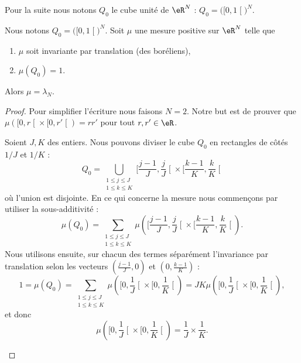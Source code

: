 Pour la suite nous notons \( Q_0\) le cube unité de \( \eR^N\) : \( Q_0=\big( \mathopen[ 0 , 1 \mathclose[ \big)^N\).

\begin{theorem}        \label{ThoCABFooHbUzWc}
	Nous notons  \( Q_0=\big( \mathopen[ 0 , 1 \mathclose[ \big)^N\). Soit \( \mu\) une mesure positive sur \( \eR^N\) telle que
	\begin{enumerate}
		\item
		      \( \mu\) soit invariante par translation (des boréliens),
		\item
		      \( \mu(Q_0)=1\).
	\end{enumerate}
	Alors \( \mu=\lambda_N\).
\end{theorem}

\begin{proof}
	Pour simplifier l'écriture nous faisons \( N=2\). Notre but est de prouver que \( \mu(  \mathopen[ 0 , r \mathclose[\times \mathopen[ 0 , r' \mathclose[ )=rr'\) pour tout \( r,r'\in \eR\).

	\begin{subproof}
		\spitem[Longueur =\( 1/J\)]
		Soient \( J,K\) des entiers. Nous pouvons diviser le cube \( Q_0\) en rectangles de côtés \( 1/J\) et \( 1/K\) :
		\begin{equation}
			Q_0=\bigcup_{\substack{1\leq j\leq J\\1\leq k\leq K}}\mathopen[ \frac{ j-1 }{ J } , \frac{ j }{ J } \mathclose[\times \mathopen[ \frac{ k-1 }{ K } , \frac{ k }{ K } \mathclose[
		\end{equation}
		où l'union est disjointe. En ce qui concerne la mesure nous commençons par utiliser la sous-additivité :
		\begin{equation}
			\mu(Q_0)=\sum_{\substack{1\leq j\leq J\\1\leq k\leq K}}\mu\left(  \mathopen[ \frac{ j-1 }{ J } , \frac{ j }{ J } \mathclose[\times \mathopen[ \frac{ k-1 }{ K } , \frac{ k }{ K } \mathclose[      \right).
		\end{equation}
		Nous utilisons ensuite, sur chacun des termes séparément l'invariance par translation selon les vecteurs \( (\frac{ j-1 }{ J },0)\) et \( ( 0,\frac{ k-1 }{ K } )\) :
		\begin{equation}
			1=\mu(Q_0)=\sum_{\substack{1\leq j\leq J\\1\leq k\leq K}}\mu\left(  \mathopen[ 0,\frac{1}{ J } \mathclose[\times \mathopen[0,\frac{1}{ K }\mathclose[      \right)=JK\mu\left(  \mathopen[ 0,\frac{1}{ J } \mathclose[\times \mathopen[0,\frac{1}{ K }\mathclose[      \right),
		\end{equation}
		et donc
		\begin{equation}
			\mu\left(  \mathopen[ 0,\frac{1}{ J } \mathclose[\times \mathopen[0,\frac{1}{ K }\mathclose[      \right)=\frac{1}{ J }\times \frac{1}{ K }.
		\end{equation}
		\spitem[Longueur \( L/K\)]


\end{subproof}
\end{proof}
